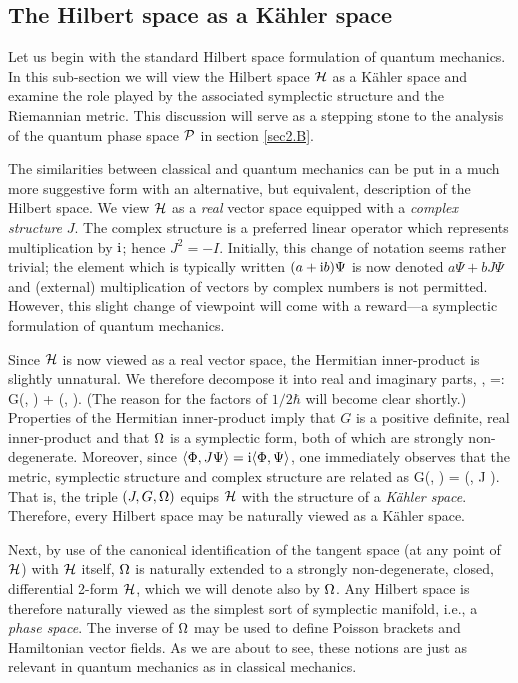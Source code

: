 \subsection{The Hilbert space as a K\"ahler space}
\label{sec2.A}

Let us begin with the standard Hilbert space formulation of quantum
mechanics.  In this sub-section we will view the Hilbert space $\H$ as
a K\"ahler space and examine the role played by the associated
symplectic structure and the Riemannian metric.  This discussion will
serve as a stepping stone to the analysis of the quantum phase space
$\P$ in section \ref{sec2.B}.

The similarities between classical and quantum mechanics can be put in
a much more suggestive form with an alternative, but equivalent,
description of the Hilbert space.  We view $\H$ as a {\em real} vector
space equipped with a {\em complex structure} $J$.  The complex
structure is a preferred linear operator which represents
multiplication by $\i$; hence $J^2 = -{I}$.  Initially, this change of
notation seems rather trivial; the element which is typically written
$(a + \i b)\Psi$ is now denoted $a\Psi + b J\Psi$ and (external)
multiplication of vectors by complex numbers is not permitted.
However, this slight change of viewpoint will come with a reward---a
symplectic formulation of quantum mechanics.

Since $\H$ is now viewed as a real vector space, the Hermitian
inner-product is slightly unnatural.  We therefore decompose it into
real and imaginary parts,
%
\be \< \Phi, \Psi\>
=: G(\Phi, \Psi) + \frac{\i}{2\hbar}\W(\Phi, \Psi).
\ee 
%
(The reason for the factors of $1/2\hbar$ will become clear shortly.)
Properties of the Hermitian inner-product imply that $G$ is a positive
definite, real inner-product and that $\W$ is a symplectic form, both
of which are strongly non-degenerate.  Moreover, since $\<\Phi, J
\Psi\> = \i \<\Phi, \Psi\>$, one immediately observes that the metric,
symplectic structure and complex structure are related as
%
\be
\label{kahler_reln} G(\Phi, \Psi) = \W(\Phi, J \Psi).  
\ee 
%
That is, the triple $(J, G, \W)$ equips $\H$ with the structure of a
{\em K\"ahler space}.  Therefore, every Hilbert space may be naturally
viewed as a K\"ahler space.

Next, by use of the canonical identification of the tangent space (at
any point of $\H$) with $\H$ itself, $\W$ is naturally extended to a
strongly non-degenerate, closed, differential 2-form $\H$, which we
will denote also by $\W$.  Any Hilbert space is therefore naturally
viewed as the simplest sort of symplectic manifold, i.e., a {\em phase
space}.  The inverse of $\W$ may be used to define Poisson brackets
and Hamiltonian vector fields.  As we are about to see, these notions
are just as relevant in quantum mechanics as in classical mechanics.


